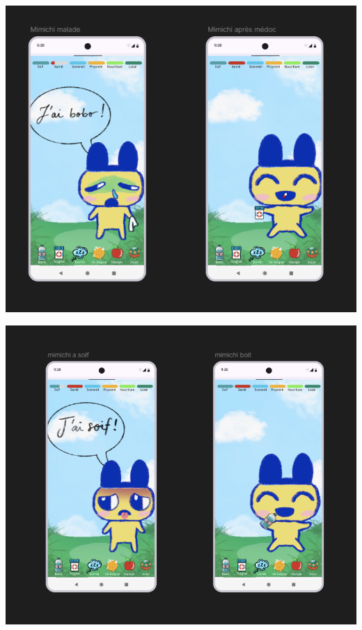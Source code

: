\documentclass{cahier_des_charges}
\begin{document}
\begin{minipage}[t]{0.48\textwidth}
    \includegraphics[width=\linewidth]{maquette/screen5.png}
\end{minipage}
\hfill
\begin{minipage}[t]{0.48\textwidth}
    \includegraphics[width=\linewidth]{maquette/screen6.png}
\end{minipage}\par\vspace{0.3cm}
\end{document}
